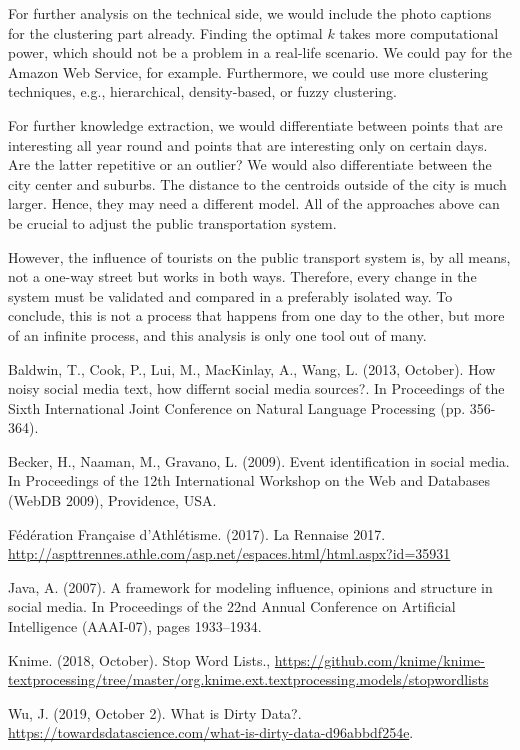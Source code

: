 \documentclass[runningheads]{llncs}
\begin{document}
For further analysis on the technical side, we would include the photo captions for the clustering part already. Finding the optimal $k$ takes more computational power, which should not be a problem in a real-life scenario. We could pay for the Amazon Web Service, for example. Furthermore, we could use more clustering techniques, e.g., hierarchical, density-based, or fuzzy clustering.

For further knowledge extraction, we would differentiate between points that are interesting all year round and points that are interesting only on certain days. Are the latter repetitive or an outlier? We would also differentiate between the city center and suburbs. The distance to the centroids outside of the city is much larger. Hence, they may need a different model. All of the approaches above can be crucial to adjust the public transportation system.

However, the influence of tourists on the public transport system is, by all means, not a one-way street but works in both ways. Therefore, every change in the system must be validated and compared in a preferably isolated way. To conclude, this is not a process that happens from one day to the other, but more of an infinite process, and this analysis is only one tool out of many.

%
%
%
% 
% 
%
\begin{thebibliography}{8}
Baldwin, T., Cook, P., Lui, M., MacKinlay, A., Wang, L. (2013, October). How noisy social media text, how differnt social media sources?. In Proceedings of the Sixth International Joint Conference on Natural Language Processing (pp. 356-364).

Becker, H., Naaman, M., Gravano, L. (2009). Event identification in social media. In Proceedings of the 12th International Workshop on the Web and Databases (WebDB 2009), Providence, USA.

Fédération Française d'Athlétisme. (2017). La Rennaise 2017. \url{http://aspttrennes.athle.com/asp.net/espaces.html/html.aspx?id=35931}

Java, A. (2007). A framework for modeling influence, opinions and structure in social media. In Proceedings of the 22nd Annual Conference on Artificial Intelligence (AAAI-07), pages 1933–1934.

Knime. (2018, October). Stop Word Lists., \url{https://github.com/knime/knime-textprocessing/tree/master/org.knime.ext.textprocessing.models/stopwordlists}

Wu, J. (2019, October 2). What is Dirty Data?. \url{https://towardsdatascience.com/what-is-dirty-data-d96abbdf254e}.
\end{thebibliography}
\end{document}
